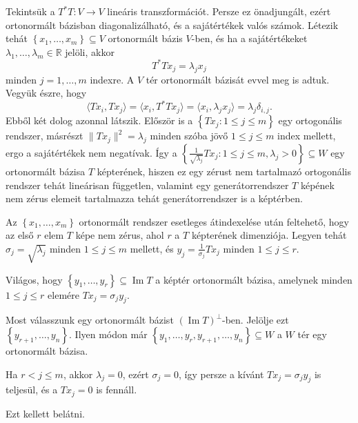 \documentclass[a4paper, showtrims]{memoir}
\makeatletter
\renewenvironment{proof}[1][\proofname]
    {\par\pushQED{\qed}%
    \normalfont \topsep6\p@\@plus6\p@\relax
    \trivlist
    \item[\hskip\labelsep
        \itshape
    #1\@addpunct{:}]\ignorespaces}
    {\popQED\endtrivlist\@endpefalse}
\theoremstyle{plain}
\theoremstyle{remark}
\theoremstyle{definition}
\DeclareMathOperator{\im}{Im}
\newcommand{\ip}[2]{\langle#1,#2\rangle}
\makeatother
\begin{document}
\begin{proof}
    Tekintsük a $T^\ast T:V\to V$ lineáris transzformációt. 
    Persze ez önadjungált, ezért ortonormált bázisban diagonalizálható,
    és a sajátértékek valós számok. 
    Létezik tehát
    \(
    \left\{ x_1,\dots,x_m \right\}\subseteq V
    \)
    ortonormált bázis $V$-ben, és ha a sajátértékeket 
    \(
    \lambda_1,\dots,\lambda_m\in\mathbb{R}
    \)
    jelöli, akkor 
    \[
        T^\ast Tx_j=\lambda_jx_j
    \]
    minden $j=1,\dots,m$ indexre.
    A $V$ tér ortonormált bázisát evvel meg is adtuk.
    Vegyük észre, hogy
    \[
        \ip{Tx_i}{Tx_j}
        =
        \ip{x_i}{T^\ast Tx_j}
        =
        \ip{x_i}{\lambda_jx_j}
        =\lambda_j\delta_{i,j}.
    \]
    Ebből két dolog azonnal látszik.
    Először is a
    \(
    \left\{ Tx_j:1\leq j\leq m \right\}
    \)
    egy ortogonális rendszer, 
    másrészt 
    \(
    \|Tx_j\|^2=\lambda_j
    \)
    minden szóba jövő $1\leq j\leq m$ index mellett, 
    ergo a sajátértékek nem negatívak.
    Így a
    \(
    \left\{\frac{1}{\sqrt{\lambda_j}}Tx_j:1\leq j\leq m,\lambda_j>0
    \right\}\subseteq W
    \)
    egy ortonormált bázisa $T$ képterének, 
    hiszen ez egy zérust nem tartalmazó ortogonális rendszer tehát lineárisan független, 
    valamint egy generátorrendszer $T$ képének nem zérus elemeit tartalmazza tehát generátorrendszer is a képtérben.

    Az $\left\{ x_1,\dots,x_m \right\}$ ortonormált rendszer esetleges átindexelése után feltehető, hogy az első $r$ elem $T$ képe nem zérus, ahol $r$ a $T$ képterének dimenziója.
    Legyen tehát 
    \(
    \sigma_j=\sqrt{\lambda_j}
    \) 
    minden $1\leq j\leq m$ mellett,
    és 
    \( 
    y_j=\frac{1}{\sigma_j}Tx_j
    \) 
    minden $1\leq j\leq r$.

    Világos, hogy $\left\{ y_1,\dots,y_r \right\}\subseteq \im T$ a képtér ortonormált bázisa,
    amelynek minden $1\leq j\leq r$ elemére $Tx_j=\sigma_jy_j$.

    Most válasszunk egy ortonormált bázist \(\left( \im T \right)^\perp\)-ben. 
    Jelölje ezt 
    \(
    \left\{ y_{r+1},\dots,y_n \right\}.
    \)
    Ilyen módon már \(\left\{ y_1,\dots,y_r,y_{r+1},\dots,y_n \right\}\subseteq W\) a $W$ tér egy ortonormált bázisa.

    Ha \(r<j\leq m\), 
    akkor $\lambda_j=0$, ezért $\sigma_j=0$, így persze 
    a kívánt $Tx_j=\sigma_jy_j$ is teljesül, 
    és a $Tx_j=0$ is fennáll.

Ezt kellett belátni. 
\end{proof}
\end{document}
